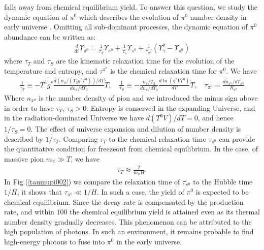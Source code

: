\documentclass[universe,article,submit,moreauthors,pdftex,a4paper]{Definitions/mdpi}
\begin{document}
falls away from chemical equilibrium yield. To answer this question, we study the dynamic equation of $\pi^0$ which describes the evolution of $\pi^0$ number density in early universe \cite{Fromerth:2012fe}. Omitting all sub-dominant processes, the dynamic equation of $\pi^0$ abundance can be written as:
\begin{align}
\frac{d}{dt}\Upsilon_{\pi^0}=\frac{1}{\tau_T}\Upsilon_{\pi^0}+\frac{1}{\tau_s}\Upsilon_{\pi^0}+\frac{1}{\tau_{\pi^0}}\left(\Upsilon^2_\gamma-\Upsilon_{\pi^0}\right)
\end{align}
where $\tau_T$ and $\tau_S$ are the kinematic relaxation time for the evolution of the temperature and entropy, and $\tau^{\pi^0}$ is the chemical relaxation time for $\pi^0$. We have
\begin{align}
\frac{1}{\tau_T}\equiv -T^3g^*\frac{d (n_{\pi}/(\Upsilon_3
g^*T^3))/dT}{dn_{\pi}/d{\Upsilon_3}}{\dot T},\label{tauT} \quad
\frac{1}{\tau_{S}}\equiv
-\frac{n_{\pi}/\Upsilon_3}{dn_{\pi}/d{\Upsilon_3}}\frac{d\ln (g^*VT^3)}{dT}
\dot{T},\quad
\tau_{\pi^0}=\frac{dn_{\pi^0}/d\Upsilon_{\pi^0}}{R_{\pi^0}} 
\end{align}
Where $n_{\pi^0}$ is the number density of pion and we introduced the minus sign above in order to have $\tau_T$, $\tau_S>0$. Entropy is conserved in the expanding Universe, and in the radiation-dominated Universe we have $d(T^3V)/dT=0$, and hence $1/\tau_S=0$. The effect of universe expansion and dilution of number density is described by $1/\tau_T$. Comparing $\tau_T$ to the chemical relaxation time $\tau_{\pi^0}$ can provide the quantitative condition for freezeout from chemical equilibrium. In the case, of massive pion $m_{\pi}\gg T$, we have \cite{Kuznetsova:2009xh}
\begin{align}
\tau_T\approx\frac{T}{m_{\pi}H}.
\end{align}
 In Fig.(\ref{taumupi002}) we compare the relaxation time of $\tau_{\pi^0}$ to the Hubble time $1/H$, it shows that $\tau_{\pi^0}\ll 1/H$. In such a case, the yield of $\pi^0$ is expected to be chemical equilibrium. Since the decay rate is compensated by the production rate, and within $100$ the chemical equilibrium yield is attained even as its thermal number density gradually decreases. This phenomenon can be attributed to the high population of photons. In such an environment, it remains probable to find high-energy photons to fuse into $\pi^0$ in the early universe. 
\end{document}
